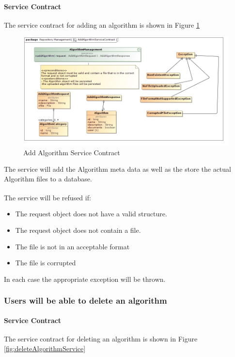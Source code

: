 \paragraph{Service Contract}
The service contract for adding an algorithm is shown in Figure \ref{fig:addAlgorithmService}

\begin{figure}[H]
  \begin{center}
  \includegraphics[scale=0.5]{../Diagrams and Charts/Test Data/AddAlgorithmServiceContract.jpg}
  \caption{Add Algorithm Service Contract}
  \label{fig:addAlgorithmService}
  \end{center}  
 \end{figure}

 The service will add the Algorithm meta data as well as the store the
 actual Algorithm files to a database.\\\\
 The service will be refused if:\\
	 \begin{itemize}
	 	\item The request object does not have a valid structure.	 	
	 	\item The request object does not contain a file.
	 	\item The file is not in an acceptable format
	 	\item The file is corrupted
	 \end{itemize}
In each case the appropriate exception will be thrown.

\subsubsection {Users will be able to delete an algorithm}
\paragraph{Service Contract}
The service contract for deleting an algorithm is shown in Figure \ref{fig:deleteAlgorithmService}

